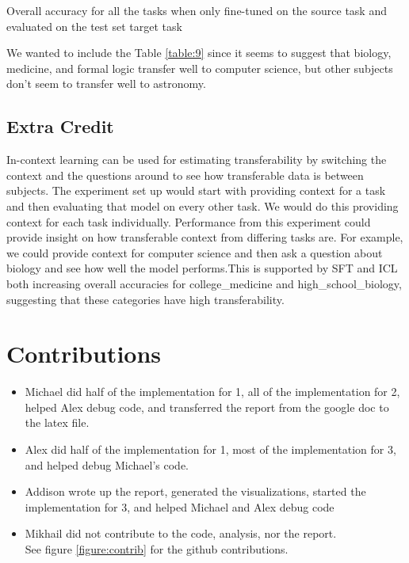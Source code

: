 \documentclass[10pt]{article}
\begin{document}
\begin{table}
  \centering
  \caption{Overall accuracy for all the tasks when only fine-tuned on the source task and evaluated on the test set target task}
  \label{table:5}
\end{table}

We wanted to include the Table \ref{table:9} since it seems to suggest that biology, medicine, and formal logic transfer well to 
computer science, but other subjects don’t seem to transfer well to astronomy.

\subsection{Extra Credit}

In-context learning can be used for estimating transferability by switching the context and the questions around to see
 how transferable data is between subjects. The experiment set up would start with providing context for a task and then 
 evaluating that model on every other task. We would do this providing context for each task individually. Performance
  from this experiment could provide insight on how transferable context from differing tasks are. For example, we could 
  provide context for computer science and then ask a question about biology and see how well the model performs.This 
  is supported by SFT and ICL both increasing overall accuracies for college\_medicine and high\_school\_biology,
   suggesting that these categories have high transferability.

%
% 

\section{Contributions}
\begin{itemize}
  \item Michael did half of the implementation for 1, all of the implementation for 2,  helped Alex debug code, and transferred the report from the google doc to the latex file.
  \item Alex did half of the implementation for 1, most of the implementation for 3, and helped debug Michael's code.
  \item Addison wrote up the report, generated the visualizations, started the implementation for 3, and helped Michael and Alex debug code
  \item Mikhail did not contribute to the code, analysis, nor the report. 
  \\See figure \ref{figure:contrib} for the github contributions.
\end{itemize}
\end{document}
